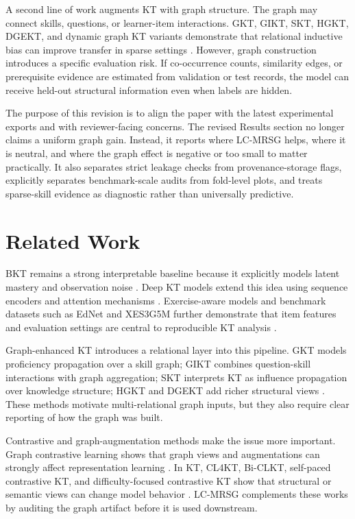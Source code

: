 \documentclass[11pt,a4paper]{article}
\newcommand{\LCMRSG}{LC-MRSG}
\begin{document}
A second line of work augments KT with graph structure. The graph may connect skills, questions, or learner-item interactions. GKT, GIKT, SKT, HGKT, DGEKT, and dynamic graph KT variants demonstrate that relational inductive bias can improve transfer in sparse settings \cite{nakagawa2019,tong2020, yang2020, tong2022,cui2024,huang2024,sun2024}. However, graph construction introduces a specific evaluation risk. If co-occurrence counts, similarity edges, or prerequisite evidence are estimated from validation or test records, the model can receive held-out structural information even when labels are hidden.

The purpose of this revision is to align the paper with the latest experimental exports and with reviewer-facing concerns. The revised Results section no longer claims a uniform graph gain. Instead, it reports where \LCMRSG{} helps, where it is neutral, and where the graph effect is negative or too small to matter practically. It also separates strict leakage checks from provenance-storage flags, explicitly separates benchmark-scale audits from fold-level plots, and treats sparse-skill evidence as diagnostic rather than universally predictive.

\section{Related Work}
BKT remains a strong interpretable baseline because it explicitly models latent mastery and observation noise \cite{corbett1994,baker2008}. Deep KT models extend this idea using sequence encoders and attention mechanisms \cite{piech2015,zhang2017,pandey2019,ghosh2020}. Exercise-aware models and benchmark datasets such as EdNet and XES3G5M further demonstrate that item features and evaluation settings are central to reproducible KT analysis \cite{liu2021ekt,choi2020,liu2023xes}.

Graph-enhanced KT introduces a relational layer into this pipeline. GKT models proficiency propagation over a skill graph; GIKT combines question-skill interactions with graph aggregation; SKT interprets KT as influence propagation over knowledge structure; HGKT and DGEKT add richer structural views \cite{nakagawa2019,yang2020,tong2020,tong2022,cui2024}. These methods motivate multi-relational graph inputs, but they also require clear reporting of how the graph was built.

Contrastive and graph-augmentation methods make the issue more important. Graph contrastive learning shows that graph views and augmentations can strongly affect representation learning \cite{you2020,zhu2021}. In KT, CL4KT, Bi-CLKT, self-paced contrastive KT, and difficulty-focused contrastive KT show that structural or semantic views can change model behavior \cite{lee2022,song2022,dai2024,zhang2024qcm,lee2024difficulty}. \LCMRSG{} complements these works by auditing the graph artifact before it is used downstream.
\end{document}
